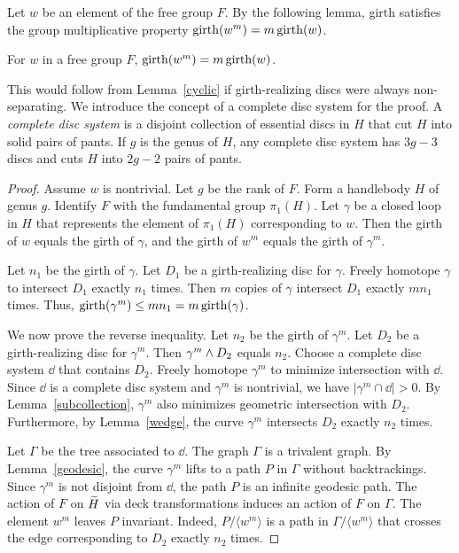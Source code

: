 Let $w$ be an element of the free group $F$.   By the following lemma, girth satisfies the group multiplicative property $\operatorname{girth}(w^{m})=m \operatorname{girth}(w)$.

\begin{lemma}
\label{power}
For $w$ in a free group $F$, $\operatorname{girth}(w^m)=m \operatorname{girth}(w)$.
\end{lemma}

This would follow from Lemma~\ref{cyclic} if girth-realizing discs were always non-separating.  We introduce the concept of a complete disc system for the proof.  A \emph{complete disc system} is a disjoint collection of essential discs in $H$ that cut $H$ into solid pairs of pants.  If $g$ is the genus of $H$, any complete disc system has $3g-3$ discs and cuts $H$ into $2g-2$ pairs of pants. 

\begin{proof}
Assume $w$ is nontrivial.  Let $g$ be the rank of $F$.  Form a handlebody $H$ of genus $g$.  Identify $F$ with the fundamental group $\pi_{1}(H)$.  Let $\gamma$ be a closed loop in $H$ that represents the element of $\pi_{1}(H)$ corresponding to $w$.  Then the girth of $w$ equals the girth of $\gamma$, and the girth of $w^{m}$ equals the girth of $\gamma^{m}$.

Let $n_{1}$ be the girth of $\gamma$.  Let $D_{1}$ be a girth-realizing disc for $\gamma$.  Freely homotope $\gamma$ to intersect $D_{1}$ exactly $n_{1}$ times.  Then $m$ copies of $\gamma$ intersect $D_{1}$ exactly $mn_{1}$ times.  Thus, $\operatorname{girth}(\gamma^m)\leq mn_{1}=m \operatorname{girth}(\gamma)$.

We now prove the reverse inequality.  Let $n_{2}$ be the girth of $\gamma^{m}$.  Let $D_{2}$ be a girth-realizing disc for $\gamma^m$.  Then $\gamma^{m}\wedge D_{2}$ equals $n_{2}$.  Choose a complete disc system $\dd$ that contains $D_{2}$.  Freely homotope $\gamma^m$ to minimize intersection with $\dd$.  Since $\dd$ is a complete disc system and $\gamma^{m}$ is nontrivial, we have $|\gamma^{m}\cap\dd|>0$.  By Lemma~\ref{subcollection}, $\gamma^{m}$ also minimizes geometric intersection with $D_{2}$.  Furthermore, by Lemma~\ref{wedge}, the curve $\gamma^{m}$ intersects $D_{2}$ exactly $n_{2}$ times.

Let $\Gamma$ be the tree associated to $\dd$.  The graph $\Gamma$ is a trivalent graph.  By Lemma~\ref{geodesic}, the curve $\gamma^{m}$ lifts to a path $P$ in $\Gamma$ without backtrackings.  Since $\gamma^{m}$ is not disjoint from $\dd$, the path $P$ is an infinite geodesic path.  The action of $F$ on $\widetilde{H}$ via deck transformations induces an action of $F$ on $\Gamma$.  The element $w^{m}$ leaves $P$ invariant.  Indeed, $P/\langle w^{m}\rangle$ is a path in $\Gamma/\langle w^{m}\rangle$ that crosses the edge corresponding to $D_{2}$ exactly $n_{2}$ times.


\end{proof}
